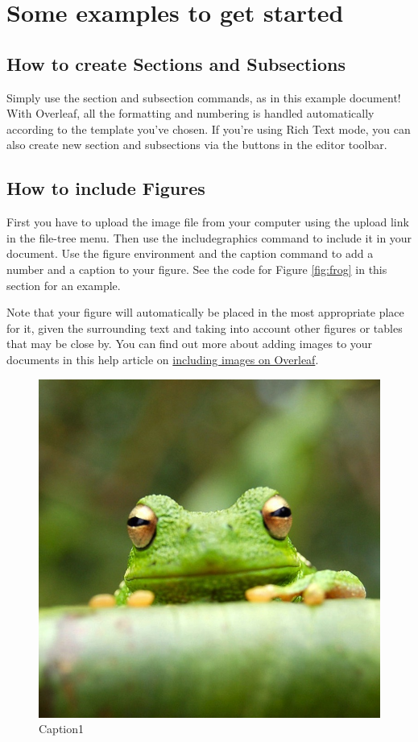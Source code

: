 \documentclass{article}
\begin{document}
    \section{Some examples to get started}

    \subsection{How to create Sections and Subsections}

    Simply use the section and subsection commands, as in this example document! With Overleaf, all the formatting and numbering is handled automatically according to the template you've chosen. If you're using Rich Text mode, you can also create new section and subsections via the buttons in the editor toolbar.

    \subsection{How to include Figures}

    First you have to upload the image file from your computer using the upload link in the file-tree menu. Then use the includegraphics command to include it in your document. Use the figure environment and the caption command to add a number and a caption to your figure. See the code for Figure \ref{fig:frog} in this section for an example.

    Note that your figure will automatically be placed in the most appropriate place for it, given the surrounding text and taking into account other figures or tables that may be close by. You can find out more about adding images to your documents in this help article on \href{https://www.overleaf.com/learn/how-to/Including_images_on_Overleaf}{including images on Overleaf}.


    \begin{figure}
        \includegraphics[width=0.9\linewidth]{frog.jpg}
        \caption{Caption1}
        \label{fig:wrapfig}
    \end{figure}
\end{document}
